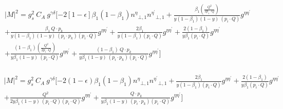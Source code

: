 \begin{equation}
\begin{split}
&{|{M}|}^2 =g_s^2\: C_A\:g^{{{\gamma}}{{\delta}}}[-2[1-\epsilon]{\beta_1}(1-\beta_1){n^{{\eta}}}_{\bot,1}{n^{{\eta}^{\prime}}}_{\bot,1}+\frac{\beta_1(\frac{Q^2}{2p_i \cdot Q})}{y(1-\beta_1) (1-y)\:(p_i \cdot Q)}g^{{{\eta}}{{\eta}^{\prime}}}\\
&+\frac{\beta_1\:Q\cdot p_k}{y(1-\beta_1) (1-y)\:(p_i \cdot p_k)(p_i \cdot Q)}g^{{{\eta}}{{\eta}^{\prime}}}+\frac{2\beta_1}{y(1-\beta_1) (p_i \cdot Q)}g^{{{\eta}}{{\eta}^{\prime}}}+\frac{2(1-\beta_1)}{y\beta_1 (p_i \cdot Q)}g^{{{\eta}}{{\eta}^{\prime}}}\\
&+\frac{(1-\beta_1)(\frac{Q^2}{2p_i \cdot Q})}{y\beta_1 (1-y)\:(p_i \cdot Q)}g^{{{\eta}}{{\eta}^{\prime}}}+\frac{(1-\beta_1)\:Q\cdot p_k}{y\beta_1 (1-y)\:(p_i \cdot p_k)(p_i \cdot Q)}g^{{{\eta}}{{\eta}^{\prime}}}]  \\
\end{split}
\end{equation}


\begin{equation}
\begin{split}
&{|{M}|}^2 =g_s^2\: C_A\:g^{{{\gamma}}{{\delta}}}[-2(1-\epsilon){\beta_1}(1-\beta_1){n^{{\eta}}}_{\bot,1}{n^{{\eta}^{\prime}}}_{\bot,1}+\frac{2\beta_1}{y(1-\beta_1) (p_i \cdot Q)}g^{{{\eta}}{{\eta}^{\prime}}}+\frac{2(1-\beta_1)}{y\beta_1 (p_i \cdot Q)}g^{{{\eta}}{{\eta}^{\prime}}}\\
&+\frac{Q^2}{2y\beta_1 (1-y)\:(p_i \cdot Q)(p_i \cdot Q)}g^{{{\eta}}{{\eta}^{\prime}}}+\frac{\:Q\cdot p_k}{y\beta_1 (1-y)\:(p_i \cdot p_k)(p_i \cdot Q)}g^{{{\eta}}{{\eta}^{\prime}}}]  \\
\end{split}
\end{equation}






















